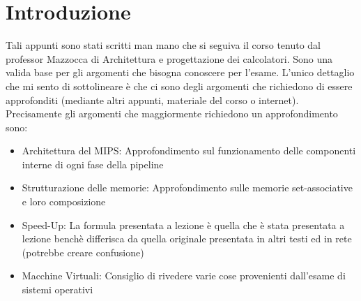 \chapter*{Introduzione}
Tali appunti sono stati scritti man mano che si seguiva il corso tenuto dal professor Mazzocca di Architettura e progettazione dei calcolatori. Sono una valida base per gli argomenti che bisogna conoscere per l'esame. L'unico dettaglio che mi sento di sottolineare è che ci sono degli argomenti che richiedono di essere approfonditi (mediante altri appunti, materiale del corso o internet). Precisamente gli argomenti che maggiormente richiedono un approfondimento sono:
\begin{itemize}
    \item Architettura del MIPS: Approfondimento sul funzionamento delle componenti interne di ogni fase della pipeline
    \item Strutturazione delle memorie: Approfondimento sulle memorie set-associative e loro composizione
    \item Speed-Up: La formula presentata a lezione è quella che è stata presentata a lezione benchè differisca da quella originale presentata in altri testi ed in rete (potrebbe creare confusione)
    \item Macchine Virtuali: Consiglio di rivedere varie cose provenienti dall'esame di sistemi operativi
\end{itemize}

